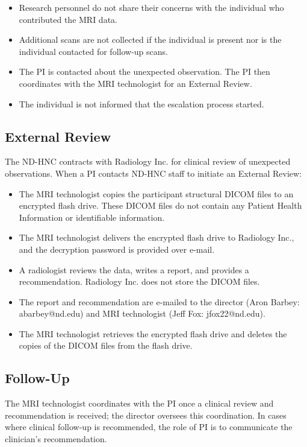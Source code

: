 \documentclass[11pt]{article}
\begin{document}
\begin{itemize}
    \item Research personnel do not share their concerns with the individual who contributed the MRI data.
    \item Additional scans are not collected if the individual is present nor is the individual contacted for follow-up scans.
    \item The PI is contacted about the unexpected observation. The PI then coordinates with the MRI technologist for an External Review.
    \item The individual is not informed that the escalation process started.
\end{itemize}


\subsection{External Review}
The ND-HNC contracts with Radiology Inc.\cite{radinc} for clinical review of unexpected observations. When a PI contacts ND-HNC staff to initiate an External Review:

\begin{itemize}
    \item The MRI technologist copies the participant structural DICOM files to an encrypted flash drive. These DICOM files do not contain any Patient Health Information or identifiable information.
    \item The MRI technologist delivers the encrypted flash drive to Radiology Inc., and the decryption password is provided over e-mail.
    \item A radiologist reviews the data, writes a report, and provides a recommendation. Radiology Inc. does not store the DICOM files.
    \item The report and recommendation are e-mailed to the director (Aron Barbey: abarbey@nd.edu) and MRI technologist (Jeff Fox: jfox22@nd.edu).
    \item The MRI technologist retrieves the encrypted flash drive and deletes the copies of the DICOM files from the flash drive.
\end{itemize}


\subsection{Follow-Up}
The MRI technologist coordinates with the PI once a clinical review and recommendation is received; the director oversees this coordination. In cases where clinical follow-up is recommended, the role of PI is to communicate the clinician's recommendation.
\end{document}

